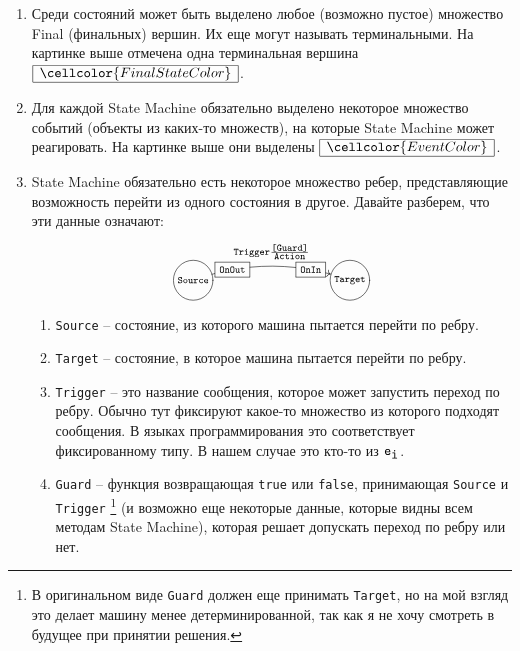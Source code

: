 \documentclass{article}
\begin{document}
{\begin{enumerate}
\item Среди состояний может быть выделено любое (возможно пустое) множество Final (финальных) вершин.
Их еще могут называть терминальными.
На картинке выше отмечена одна терминальная вершина  $\begin{array}{|c|}\hline{\cellcolor{FinalStateColor}}\\\hline\end{array}$.

\item Для каждой State Machine обязательно выделено некоторое множество событий (объекты из каких-то множеств), на которые State Machine может реагировать.
На картинке выше они выделены $\begin{array}{|c|}\hline{\cellcolor{EventColor}}\\\hline\end{array}$.

\item State Machine обязательно есть некоторое множество ребер, представляющие возможность перейти из одного состояния в другое.
Давайте разберем, что эти данные означают:
\[
\xymatrix{
  *+=+[o][F-]{\scriptstyle\texttt{Source}}\ar@/^10pt/[rrr]^{\raisebox{5pt}{$\scriptstyle\texttt{Trigger} \frac{\scriptstyle \texttt{[Guard]}}{\scriptstyle \texttt{Action}}$}}|(0.25){\boxed{\scriptstyle\texttt{OnOut}}}|(0.75){\boxed{\scriptstyle\texttt{OnIn}}}&{}&{}&
  *+=+[o][F-]{\scriptstyle\texttt{Target}}\\
}
\]
\begin{enumerate}
\item \verb"Source" -- состояние, из которого машина пытается перейти по ребру.

\item \verb"Target" -- состояние, в которое машина пытается перейти по ребру.

\item \verb"Trigger" -- это название сообщения, которое может запустить переход по ребру.
Обычно тут фиксируют какое-то множество из которого подходят сообщения.
В языках программирования это соответствует фиксированному типу.
В нашем случае это кто-то из $\verb"e"_{\verb"i"}$.

\item \verb"Guard" -- функция возвращающая \verb"true" или \verb"false", принимающая \verb"Source" и \verb"Trigger"%
\footnote{В оригинальном виде \texttt{Guard} должен еще принимать \texttt{Target}, но на мой взгляд это делает машину менее детерминированной, так как я не хочу смотреть в будущее при принятии решения.}
(и возможно еще некоторые данные, которые видны всем методам State Machine), которая решает допускать переход по ребру или нет.


\end{enumerate}
\end{enumerate}}
\end{document}
